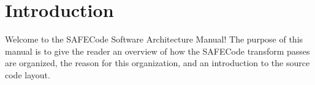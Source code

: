 \section{Introduction}
\label{section:intro}

Welcome to the SAFECode Software Architecture Manual!  The purpose of
this manual is to give the reader an overview of how the SAFECode
transform passes are organized, the reason for this organization, and
an introduction to the source code layout.
